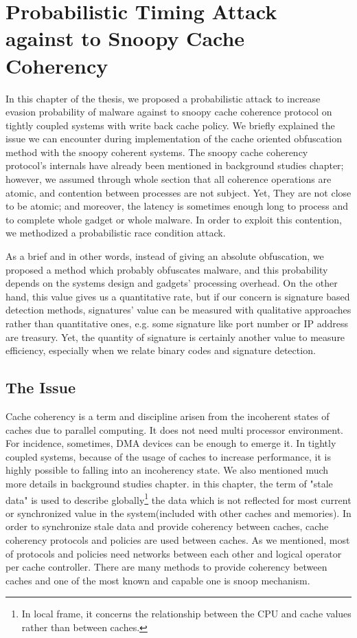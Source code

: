 \chapter{Probabilistic Timing Attack against to Snoopy Cache Coherency}
In this chapter of the thesis, we proposed a probabilistic attack to increase evasion probability of malware against to snoopy cache coherence protocol on tightly coupled systems with write back cache policy. We briefly explained the issue we can encounter during implementation of the cache oriented obfuscation method with the snoopy coherent systems. The snoopy cache coherency protocol's internals have already been mentioned in background studies chapter; however, we assumed through whole section that all coherence operations are atomic, and contention between processes are not subject. Yet, They are not close to be atomic; and moreover, the latency is sometimes enough long to process and to complete whole gadget or whole malware. In order to exploit this contention, we methodized a probabilistic race condition attack. 

As a brief and in other words, instead of giving an absolute obfuscation, we proposed a method which probably obfuscates malware, and this probability depends on the systems design and gadgets' processing overhead. On the other hand, this value gives us a quantitative rate, but if our concern is signature based detection methods, signatures' value can be measured with qualitative approaches rather than quantitative ones, e.g. some signature like port number or IP address are treasury.  Yet, the quantity of signature is certainly another value to measure efficiency, especially when we relate binary codes and signature detection.

\section{The Issue}
Cache coherency is a term and discipline arisen from the incoherent states of caches due to parallel computing. It does not need multi processor environment. For incidence, sometimes, DMA devices can be enough to emerge it. In tightly coupled systems, because of the usage of caches to increase performance, it is highly possible to falling into an incoherency state. We also mentioned much more details in background studies chapter. in this chapter, the term of "stale data" is used to describe globally\footnote{In local frame, it concerns the relationship between the CPU and cache values rather than between caches. } the data which is not reflected for most current or synchronized value in the system(included with other caches and memories). In order to synchronize stale data and provide coherency between caches, cache coherency protocols and policies are used between caches. As we mentioned, most of  protocols and policies need networks between each other and logical operator per cache controller. There are many methods to provide coherency between caches and one of the most known and capable one is snoop mechanism. 

